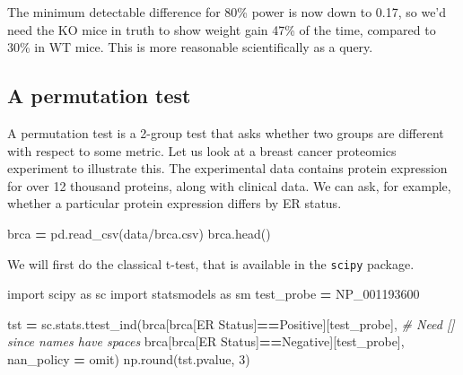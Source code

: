 \documentclass[
  letterpaper,
]{scrbook}
\newenvironment{Shaded}{\begin{snugshade}}{\end{snugshade}}
\newcommand{\BuiltInTok}[1]{#1}
\newcommand{\CommentTok}[1]{\textcolor[rgb]{0.56,0.35,0.01}{\textit{#1}}}
\newcommand{\DecValTok}[1]{\textcolor[rgb]{0.00,0.00,0.81}{#1}}
\newcommand{\ImportTok}[1]{#1}
\newcommand{\NormalTok}[1]{#1}
\newcommand{\OperatorTok}[1]{\textcolor[rgb]{0.81,0.36,0.00}{\textbf{#1}}}
\newcommand{\StringTok}[1]{\textcolor[rgb]{0.31,0.60,0.02}{#1}}
\begin{document}
The minimum detectable difference for 80\% power is now down to 0.17, so we'd need the KO mice in truth to show weight gain 47\% of the time, compared to 30\% in WT mice. This is more reasonable scientifically as a query.

\hypertarget{a-permutation-test}{%
\subsection{A permutation test}\label{a-permutation-test}}

A permutation test is a 2-group test that asks whether two groups are different with respect to some metric. Let us look at a breast cancer proteomics experiment to illustrate this. The experimental data contains protein expression for over 12 thousand proteins, along with clinical data. We can ask, for example, whether a particular protein expression differs by ER status.

\begin{Shaded}
\begin{Highlighting}[]
\NormalTok{brca }\OperatorTok{=}\NormalTok{ pd.read\_csv(}\StringTok{\textquotesingle{}data/brca.csv\textquotesingle{}}\NormalTok{)}
\NormalTok{brca.head()}
\end{Highlighting}
\end{Shaded}

We will first do the classical t-test, that is available in the \texttt{scipy} package.

\begin{Shaded}
\begin{Highlighting}[]
\ImportTok{import}\NormalTok{ scipy }\ImportTok{as}\NormalTok{ sc}
\ImportTok{import}\NormalTok{ statsmodels }\ImportTok{as}\NormalTok{ sm}
\NormalTok{test\_probe }\OperatorTok{=} \StringTok{\textquotesingle{}NP\_001193600\textquotesingle{}}

\NormalTok{tst }\OperatorTok{=}\NormalTok{ sc.stats.ttest\_ind(brca[brca[}\StringTok{\textquotesingle{}ER Status\textquotesingle{}}\NormalTok{]}\OperatorTok{==}\StringTok{\textquotesingle{}Positive\textquotesingle{}}\NormalTok{][test\_probe], }\CommentTok{\# Need [] since names have spaces}
\NormalTok{                   brca[brca[}\StringTok{\textquotesingle{}ER Status\textquotesingle{}}\NormalTok{]}\OperatorTok{==}\StringTok{\textquotesingle{}Negative\textquotesingle{}}\NormalTok{][test\_probe], }
\NormalTok{                  nan\_policy }\OperatorTok{=} \StringTok{\textquotesingle{}omit\textquotesingle{}}\NormalTok{)}
\NormalTok{np.}\BuiltInTok{round}\NormalTok{(tst.pvalue, }\DecValTok{3}\NormalTok{)}
\end{Highlighting}
\end{Shaded}
\end{document}
